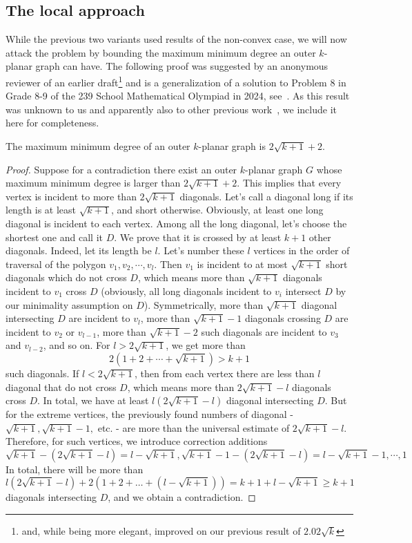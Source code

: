 \documentclass[nolineno,a4paper,USenglish,cleveref,autoref,thm-restate]
{socg}
\begin{document}
\subsection{The local approach}
\label{sec:direct-approach}
While the previous two variants used results of the non-convex case, we will now attack the problem by bounding the maximum minimum degree an outer $k$-planar graph can have.
The following proof was suggested by an anonymous reviewer of an earlier draft\footnote{and, while being more elegant, improved on our previous result of $2.02\sqrt{k}$} and is a generalization of a solution to Problem 8 in Grade 8-9 of the 239 School Mathematical Olympiad in 2024, see~\cite{357c0fe24bc3431eac6c30a0afea69fe}.
As this result was unknown to us and apparently also to other previous work~\cite{DBLP:conf/compgeom/AichholzerOOPSS22,chaplick2017beyond,ábrego2024bookcrossingnumberscomplete}, we include it here for completeness.
\begin{theorem}\label{thm:general-maxmindeg} 
The maximum minimum degree of an outer $k$-planar graph is $2\sqrt{k+1}+2$.
\end{theorem}
\begin{proof}
Suppose for a contradiction there exist an outer $k$-planar graph $G$ whose maximum minimum degree is larger than $2\sqrt{k+1}+2$.
This implies that every vertex is incident to more than $2\sqrt{k+1}$ diagonals. Let's call a diagonal long if its length is at least $\sqrt{k+1}$, and short otherwise. Obviously, at least one long diagonal is incident to each vertex. Among all the long diagonal, let's choose the shortest one and call it $D$. We prove that it is crossed by at least $k+1$ other diagonals. Indeed, let its length be $l$. Let's number these $l$ vertices in the order of traversal of the polygon $v_1, v_2, \cdots, v_l$. Then $v_1$ is incident to at most $\sqrt{k+1}$ short diagonals which do not cross $D$, which means more than  $\sqrt{k+1}$ diagonals incident to $v_1$ cross $D$ (obviously, all long diagonals incident to $v_i$ intersect $D$ by our minimality assumption on $D$). Symmetrically, more than $\sqrt{k+1}$ diagonal intersecting $D$ are incident to $v_l$, more than $\sqrt{k+1}-1$ diagonals crossing $D$ are incident to $v_2$ or $v_{l-1}$, more than $\sqrt{k+1}-2$ such diagonals are incident to $v_3$ and $v_{l-2}$, and so on. For $l > 2\sqrt{k+1}$, we get more than
$$2(1 + 2 + \cdots + \sqrt{k+1})  > k+1$$
such diagonals. If $l < 2\sqrt{k+1}$, then from each vertex there are less than $l$ diagonal that do not cross $D$, which means more than $2\sqrt{k+1} -l$ diagonals cross $D$. In total, we have at least $l(2\sqrt{k+1}-l)$ diagonal intersecting $D$. But for the extreme vertices, the previously found numbers of diagonal - $\sqrt{k+1}, \sqrt{k+1}-1,$ etc. - are more than the universal estimate of $2\sqrt{k+1} - l$. Therefore, for such vertices, we introduce correction additions \[\sqrt{k+1} - (2\sqrt{k+1} - l) = l - \sqrt{k+1}, \sqrt{k+1} - 1 - (2\sqrt{k+1} - l) = l - \sqrt{k+1} - 1, \cdots, 1\]
In total, there will be more than
\[l(2\sqrt{k+1} - l)+2(1+2+\dots+ (l - \sqrt{k+1})) = k+1 + l - \sqrt{k+1} \geq k+1\]
diagonals intersecting $D$, and we obtain a contradiction.
\end{proof}
\end{document}
